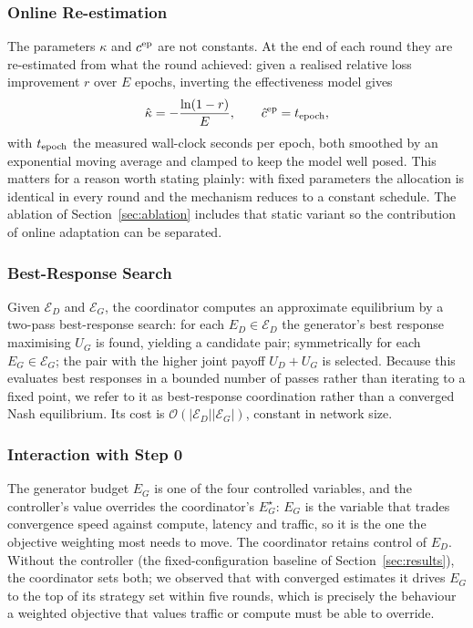 \documentclass[journal]{IEEEtran}
\begin{document}
\subsubsection{Online Re-estimation}
The parameters $\kappa$ and $c^{\rm ep}$ are not constants. At the end of each
round they are re-estimated from what the round achieved: given a realised
relative loss improvement $r$ over $E$ epochs, inverting the effectiveness
model gives
\begin{equation}
\hat{\kappa}=-\frac{\ln(1-r)}{E},\qquad
\hat{c}^{\rm ep}=t_{\rm epoch},
\label{eq:kappahat}
\end{equation}
with $t_{\rm epoch}$ the measured wall-clock seconds per epoch, both smoothed
by an exponential moving average and clamped to keep the model well posed. This matters for a reason worth stating plainly: with fixed
parameters the allocation is identical in every round and the mechanism reduces
to a constant schedule. The ablation of Section~\ref{sec:ablation} includes that
static variant so the contribution of online adaptation can be separated.

\subsubsection{Best-Response Search}
Given $\mathcal{E}_D$ and $\mathcal{E}_G$, the coordinator computes an
approximate equilibrium by a two-pass best-response search: for each
$E_D\in\mathcal{E}_D$ the generator's best response maximising $U_G$ is found,
yielding a candidate pair; symmetrically for each $E_G\in\mathcal{E}_G$; the
pair with the higher joint payoff $U_D+U_G$ is selected. Because this evaluates
best responses in a bounded number of passes rather than iterating to a fixed
point, we refer to it as best-response coordination rather than a converged
Nash equilibrium. Its cost is $\mathcal{O}(|\mathcal{E}_D||\mathcal{E}_G|)$,
constant in network size.

\subsubsection{Interaction with Step 0}
The generator budget $E_G$ is one of the four controlled variables, and the
controller's value overrides the coordinator's $E^\star_G$: $E_G$ is the
variable that trades convergence speed against compute, latency and traffic,
so it is the one the objective weighting most needs to move. The coordinator
retains control of $E_D$. Without the controller (the fixed-configuration
baseline of Section~\ref{sec:results}), the coordinator sets both; we observed
that with converged estimates it drives $E_G$ to the top of its strategy set
within five rounds, which is precisely the behaviour a weighted objective that
values traffic or compute must be able to override.
\end{document}
